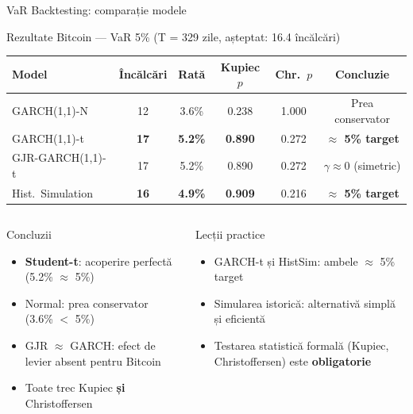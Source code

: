 \documentclass[9pt, aspectratio=169, t]{beamer}
\begin{document}
\begin{frame}{VaR Backtesting: comparație modele}
    \vspace{-0.1cm}
    {\footnotesize
    \begin{block}{Rezultate Bitcoin --- VaR 5\% (T = 329 zile, așteptat: 16.4 încălcări)}
        \begin{center}
        \begin{tabular}{lccccc}
            \toprule
            \textbf{Model} & \textbf{Încălcări} & \textbf{Rată} & \textbf{Kupiec $p$} & \textbf{Chr.\ $p$} & \textbf{Concluzie} \\
            \midrule
            GARCH(1,1)-N & 12 & 3.6\% & 0.238 & 1.000 & Prea conservator \\
            \rowcolor{Forest!15} GARCH(1,1)-t & \textbf{17} & \textbf{5.2\%} & \textbf{0.890} & 0.272 & \textcolor{Forest}{\textbf{$\approx$ 5\% target}} \\
            GJR-GARCH(1,1)-t & 17 & 5.2\% & 0.890 & 0.272 & $\gamma \approx 0$ (simetric) \\
            \rowcolor{Forest!15} Hist.\ Simulation & \textbf{16} & \textbf{4.9\%} & \textbf{0.909} & 0.216 & \textcolor{Forest}{\textbf{$\approx$ 5\% target}} \\
            \bottomrule
        \end{tabular}
        \end{center}
    \end{block}
    }

    \vspace{0.1cm}

    \begin{columns}[T]
        \begin{exampleblock}{Concluzii}
            \begin{itemize}\setlength{\itemsep}{0pt}
                \item \textbf{Student-t}: acoperire perfectă (5.2\% $\approx$ 5\%)
                \item Normal: prea conservator (3.6\% $<$ 5\%)
                \item GJR $\approx$ GARCH: efect de levier absent pentru Bitcoin
                \item Toate trec Kupiec \textbf{și} Christoffersen
            \end{itemize}
        \end{exampleblock}

        \begin{alertblock}{Lecții practice}
            \begin{itemize}\setlength{\itemsep}{0pt}
                \item GARCH-t și HistSim: ambele $\approx$ 5\% target
                \item Simularea istorică: alternativă simplă și eficientă
                \item Testarea statistică formală (Kupiec, Christoffersen) este \textbf{obligatorie}
            \end{itemize}
        \end{alertblock}
    \end{columns}
\end{frame}
\end{document}
